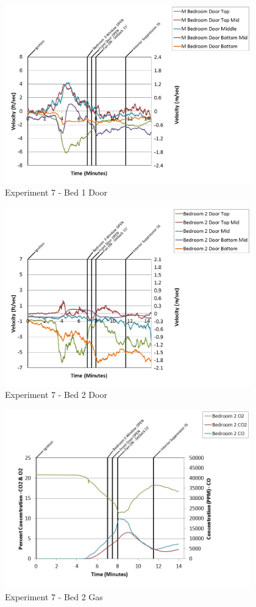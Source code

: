 \documentclass{article}
\begin{document}
\begin{appendices}
\clearpage

\begin{figure}[h!]
	\centering
	\includegraphics[height=3.05in]{0_Images/Results_Charts/Exp_7_Charts/Bed1Door.png}
	\caption{Experiment 7 - Bed 1 Door}
\end{figure}


\begin{figure}[h!]
	\centering
	\includegraphics[height=3.05in]{0_Images/Results_Charts/Exp_7_Charts/Bed2Door.png}
	\caption{Experiment 7 - Bed 2 Door}
\end{figure}

\clearpage

\begin{figure}[h!]
	\centering
	\includegraphics[height=3.05in]{0_Images/Results_Charts/Exp_7_Charts/Bed2Gas.png}
	\caption{Experiment 7 - Bed 2 Gas}
\end{figure}



\end{appendices}
\end{document}
